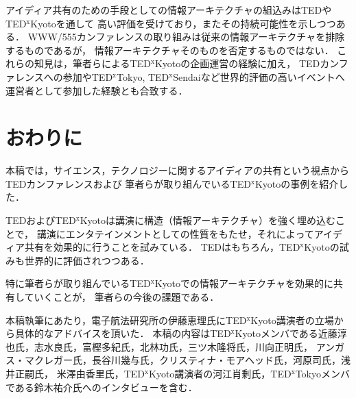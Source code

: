 \documentclass[submit,techreq,jkeyword,noauthor]{ipsj}
\newcommand{\TED}{\textrm{TED}}
\newcommand{\TEDx}{\TED${}^{\textrm{x}}$}
\newcommand{\TEDxTokyo}{\TEDx\textrm{Tokyo}}
\newcommand{\TEDxKyoto}{\TEDx\-\textrm{Kyoto}}
\newcommand{\TEDxSendai}{\TEDx\textrm{Sendai}}
\begin{document}
アイディア共有のための手段としての情報アーキテクチャの組込みは\TED や\TEDxKyoto を通して
高い評価を受けており，またその持続可能性を示しつつある．
WWW/555カンファレンスの取り組みは従来の情報アーキテクチャを排除するものであるが，
情報アーキテクチャそのものを否定するものではない．
これらの知見は，筆者らによる\TEDxKyoto の企画運営の経験に加え，
\TED カンファレンスへの参加や\TEDxTokyo, \TEDxSendai など世界的評価の高いイベントへ
運営者として参加した経験とも合致する．



\section{おわりに}

本稿では，サイエンス，テクノロジーに関するアイディアの共有という視点から\TED カンファレンスおよび
筆者らが取り組んでいる\TEDxKyoto の事例を紹介した．

\TED および\TEDxKyoto は講演に構造（情報アーキテクチャ）を強く埋め込むことで，
講演にエンタテインメントとしての性質をもたせ，それによってアイディア共有を効果的に行うことを試みている．
\TED はもちろん，\TEDxKyoto の試みも世界的に評価されつつある．

特に筆者らが取り組んでいる\TEDxKyoto での情報アーキテクチャを効果的に共有していくことが，
筆者らの今後の課題である．

\begin{acknowledgment}
\begingroup\footnotesize
本稿執筆にあたり，電子航法研究所の伊藤恵理氏に\TEDxKyoto 講演者の立場から具体的なアドバイスを頂いた．
本稿の内容は\TEDxKyoto メンバである近藤淳也氏，志水良氏，富樫多紀氏，北林功氏，三ツ木隆将氏，川向正明氏，
アンガス・マクレガー氏，長谷川幾与氏，クリスティナ・モアヘッド氏，河原司氏，浅井正嗣氏，
米澤由香里氏，\TEDxKyoto 講演者の河江肖剰氏，\TEDxTokyo メンバである鈴木祐介氏へのインタビューを含む．
\endgroup
\end{acknowledgment}
\end{document}
